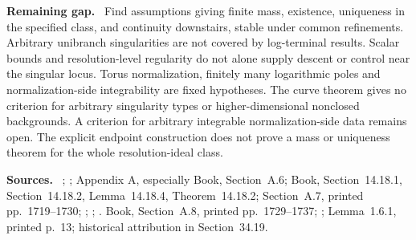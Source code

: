 \documentclass[11pt]{article}
\newcommand{\field}[1]{\par\medskip\noindent\textbf{#1.}\ }
\begin{document}
\field{Remaining gap} Find assumptions giving finite mass, existence, uniqueness in the specified class, and continuity downstairs, stable under common refinements. Arbitrary unibranch singularities are not covered by log-terminal results. Scalar bounds and resolution-level regularity do not alone supply descent or control near the singular locus. Torus normalization, finitely many logarithmic poles and normalization-side integrability are fixed hypotheses. The curve theorem gives no criterion for arbitrary singularity types or higher-dimensional nonclosed backgrounds. A criterion for arbitrary integrable normalization-side data remains open. The explicit endpoint construction does not prove a mass or uniqueness theorem for the whole resolution-ideal class.
\field{Sources} \cite[Theorem B]{Dang26}; \cite[Theorems A and A']{Pan25}; Appendix A, especially Book, Section~A.6; Book, Section~14.18.1, Section~14.18.2, Lemma~14.18.4, Theorem~14.18.2; Section~A.7, printed pp.~1719--1730; ; ; . Book, Section~A.8, printed pp.~1729--1737; ; Lemma~1.6.1, printed p.~13; historical attribution in Section~34.19.
\end{document}
